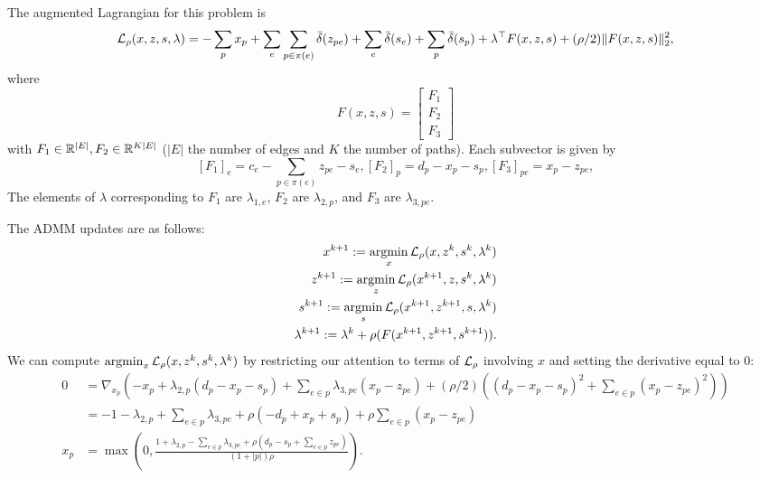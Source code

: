 \documentclass[11pt]{article}
\begin{document}
The augmented Lagrangian for this problem is
\begin{equation}
    \label{eqn:network-lagrangian}
    \mathcal{L}_\rho(x,z,s,\lambda) =-\sum_p x_p + \sum_e\sum_{p\in\pi(e)} \bar\delta(z_{pe})
        + \sum_{e} \bar\delta(s_{e})
        + \sum_{p} \bar\delta(s_{p})
        + \lambda^\top F(x,z,s)
        + (\rho/2)\| F(x,z,s) \|_2^2,
\end{equation}
where
$$F(x,z,s) =
\begin{bmatrix}
F_1 \\
F_2 \\
F_3
\end{bmatrix}
$$
with $F_1 \in \mathbb{R}^{|E|}, F_2\in\mathbb{R}^{K|E|}$
($|E|$ the number of edges and $K$ the number of paths).
Each subvector is given by
$$
    [F_1]_e = c_e - \sum_{p\in\pi(e)}z_{pe} - s_{e},
    [F_2]_{p} = d_p - x_p - s_p,
    [F_3]_{pe} = x_p - z_{pe},
$$
The elements of $\lambda$ corresponding to $F_1$ are $\lambda_{1,e}$,
$F_2$ are $\lambda_{2,p}$, and $F_3$ are $\lambda_{3,pe}$.

The ADMM updates are as follows:
\begin{equation}
    \begin{aligned}
        x^{k+1} := \operatorname*{argmin}_{x} \mathcal{L}_\rho(x,z^k,s^{k},\lambda^k)\\
        z^{k+1} := \operatorname*{argmin}_{z} \mathcal{L}_\rho(x^{k+1},z,s^{k},\lambda^k)\\
        s^{k+1} := \operatorname*{argmin}_{s} \mathcal{L}_\rho(x^{k+1},z^{k+1},s,\lambda^k)\\
        \lambda^{k+1} := \lambda^k + \rho(F(x^{k+1},z^{k+1},s^{k+1})).
    \end{aligned}
\end{equation}
We can compute $\operatorname*{argmin}_{x} \mathcal{L}_\rho(x,z^k,s^k,\lambda^k)$ by restricting our
attention to terms of $\mathcal{L}_\rho$ involving $x$ and setting the derivative equal to 0:
\begin{align*}
0
&= \nabla_{x_p}(-x_p + \lambda_{2,p}(d_p - x_p - s_p) + \sum_{e\in p}\lambda_{3,pe}(x_p - z_{pe})
+ (\rho/2)((d_p - x_p - s_p)^2 + \sum_{e \in p}(x_p - z_{pe})^2))\\
&= -1 -\lambda_{2,p} + \sum_{e \in p}\lambda_{3,pe} + \rho(-d_p + x_p + s_p)
    +\rho\sum_{e \in p} (x_p - z_{pe})\\
x_p &= \max(0,\frac{1 + \lambda_{2,p} - \sum_{e \in p}\lambda_{3,pe}
    + \rho(d_p - s_p + \sum_{e\in p} z_{pe})}
{(1+|p|)\rho}).
\end{align*}
\end{document}
